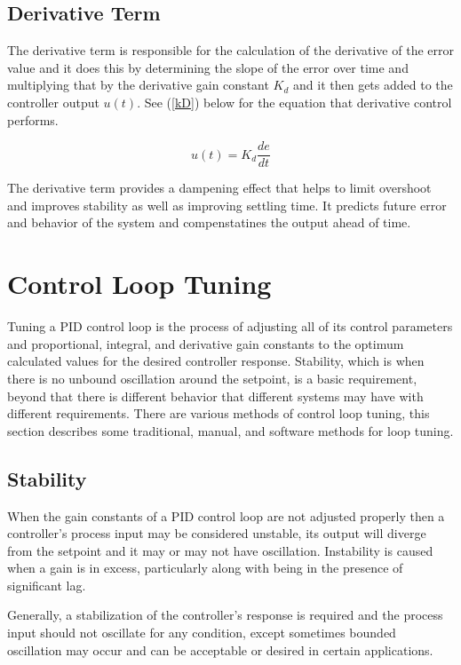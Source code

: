 \documentclass[10pt,conference]{IEEEtran}
\begin{document}
\subsection{Derivative Term}

The derivative term is responsible for the calculation of the derivative of the error value
and it does this by determining the slope of the error over time and multiplying that by
the derivative gain constant \(K_d\) and it then gets added to the controller output \(u(t)\).
See (\ref{kD}) below for the equation that derivative control performs.

\begin{equation}
    \displaystyle {u(t)=K_d\frac{de}{dt}}\label{kD}
\end{equation}

The derivative term provides a dampening effect that helps to limit overshoot and improves
stability as well as improving settling time. It predicts future error and behavior of the
system and compenstatines the output ahead of time.

\section{Control Loop Tuning}

Tuning a PID control loop is the process of adjusting all of its control parameters and
proportional, integral, and derivative gain constants to the optimum calculated values
for the desired controller response. Stability, which is when there is no unbound
oscillation around the setpoint, is a basic requirement, beyond that there is different
behavior that different systems may have with different requirements. There are various
methods of control loop tuning, this section describes some traditional, manual, and
software methods for loop tuning.

\subsection{Stability}

When the gain constants of a PID control loop are not adjusted properly then a controller's
process input may be considered unstable, its output will diverge from the setpoint and it
may or may not have oscillation. Instability is caused when a gain is in excess, particularly
along with being in the presence of significant lag.

Generally, a stabilization of the controller's response is required and the process input
should not oscillate for any condition, except sometimes bounded oscillation may occur and
can be acceptable or desired in certain applications.
\end{document}

